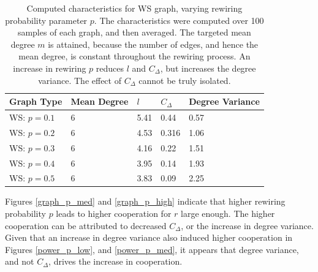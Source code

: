 \FloatBarrier
\begin{table}[!h]
\begin{center}
\begin{tabular}{|l|l|l|l|l|}
\hline
Graph Type & Mean Degree & $l$ & $C_\Delta$ & Degree Variance \\ \hline
WS: $p=0.1$        & 6        & 5.41                         & 0.44                  & 0.57           \\ \hline
WS: $p=0.2$        &6           & 4.53                         & 0.316                   & 1.06               \\ \hline
WS: $p=0.3$        &6           & 4.16                         & 0.22                   & 1.51               \\ \hline
WS: $p=0.4$       & 6        & 3.95                         & 0.14                  & 1.93           \\ \hline
WS: $p=0.5$         & 6           & 3.83                         & 0.09                   & 2.25            \\ \hline
\end{tabular}
\caption{Computed characteristics for WS graph, varying rewiring probability parameter $p$. The characteristics were computed over 100 samples of each graph, and then averaged. The targeted mean degree $m$ is attained, because the number of edges, and hence the mean degree, is constant throughout the rewiring process. An increase in rewiring $p$ reduces $l$ and $C_\Delta$, but increases the degree variance. The effect of $C_\Delta$ cannot be truly isolated. } \label{graph_stats_WS}
\end{center}
\end{table}
\FloatBarrier

\FloatBarrier
{}
\FloatBarrier
Figures \ref{graph_p_med} and \ref{graph_p_high} indicate that higher rewiring probability $p$ leads to higher cooperation for $r$ large enough. The higher cooperation can be attributed to decreased $C_\Delta$, or the increase in degree variance. Given that an increase in degree variance also induced higher cooperation in Figures \ref{power_p_low}, and \ref{power_p_med}, it appears that degree variance, and not $C_\Delta$, drives the increase in cooperation.  \\

